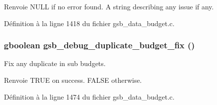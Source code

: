\begin{DoxyReturn}{Renvoie}
NULL if no error found. A string describing any issue if any. 
\end{DoxyReturn}


Définition à la ligne 1418 du fichier gsb\_\-data\_\-budget.c.

\subsubsection[{gsb\_\-debug\_\-duplicate\_\-budget\_\-fix}]{\setlength{\rightskip}{0pt plus 5cm}gboolean gsb\_\-debug\_\-duplicate\_\-budget\_\-fix ()}\label{gsb__data__budget_8h_a2ed32cf7e76ee11f9524934bd1550f5d}
Fix any duplicate in sub budgets.

\begin{DoxyReturn}{Renvoie}
TRUE on success. FALSE otherwise. 
\end{DoxyReturn}


Définition à la ligne 1474 du fichier gsb\_\-data\_\-budget.c.

